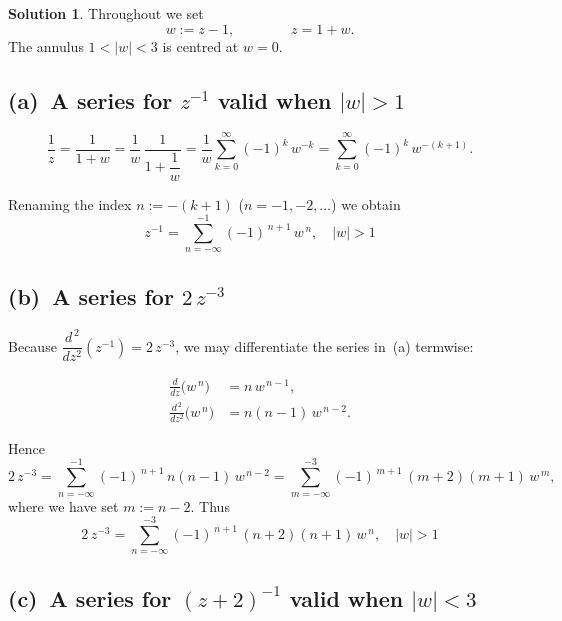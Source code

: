 \documentclass[12pt]{article}
\theoremstyle{definition} %
\newtheorem{solution}{Solution}
\theoremstyle{plain} %
\begin{document}
   \begin{solution}
   Throughout we set 
   \[
      w:=z-1,
      \qquad\qquad
      z=1+w .
   \]
   The annulus $1<|w|<3$ is centred at $w=0$.
   
   \subsection*{(a) A series for \boldmath$z^{-1}$ valid when $|w|>1$}
   
   \[
      \frac1{z}
      =\frac1{1+w}
      =\frac1{w}\,\frac1{1+\dfrac1{w}}
      =\frac1{w}\sum_{k=0}^{\infty}(-1)^{k}\,w^{-k}
      =\sum_{k=0}^{\infty}(-1)^{k}\,w^{-(k+1)} .
   \]
   
   Renaming the index $n:=-(k+1)$ ($n=-1,-2,\dots$) we obtain
   \[
      \boxed{\;
         \displaystyle
         z^{-1}
         =\sum_{n=-\infty}^{-1} (-1)^{\,n+1}\,w^{\,n},
         \quad |w|>1
      \;}
   \]
   
   \subsection*{(b) A series for \boldmath$2\,z^{-3}$}
   
   Because $\dfrac{d^{\,2}}{dz^{2}}(z^{-1})=2\,z^{-3}$, we may differentiate
   the series in (a) termwise:
   
   \[
   \begin{aligned}
      \frac{d}{dz}\bigl(w^{\,n}\bigr)
         &= n\,w^{\,n-1},\\[2pt]
      \frac{d^{\,2}}{dz^{2}}\bigl(w^{\,n}\bigr)
         &= n(n-1)\,w^{\,n-2}.
   \end{aligned}
   \]
   
   Hence
   \[
      2\,z^{-3}
      =\sum_{n=-\infty}^{-1} (-1)^{\,n+1}\,
        n(n-1)\,w^{\,n-2}
      =\sum_{m=-\infty}^{-3}
         (-1)^{\,m+1}\,(m+2)(m+1)\,w^{\,m},
   \]
   where we have set $m:=n-2$.
   Thus
   \[
      \boxed{\;
         2\,z^{-3}
         =\sum_{n=-\infty}^{-3}
             (-1)^{\,n+1}\,(n+2)(n+1)\,w^{\,n},
         \quad |w|>1
      \;}
   \]
   
   \subsection*{(c) A series for \boldmath$(z+2)^{-1}$ valid when $|w|<3$}
   

\end{solution}
\end{document}
